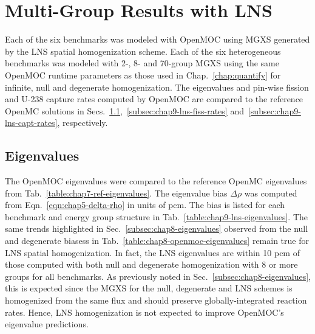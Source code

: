 \section{Multi-Group Results with LNS}
\label{sec:chap9-lns-results}

Each of the six benchmarks was modeled with OpenMOC using \ac{MGXS} generated by the \ac{LNS} spatial homogenization scheme. Each of the six heterogeneous benchmarks was modeled with 2-, 8- and 70-group \ac{MGXS} using the same OpenMOC runtime parameters as those used in Chap.~\ref{chap:quantify} for infinite, null and degenerate homogenization. The eigenvalues and pin-wise fission and U-238 capture rates computed by OpenMOC are compared to the reference OpenMC solutions in Secs.~\ref{subsec:chap9-lns-eigenvalues},~\ref{subsec:chap9-lns-fiss-rates} and~\ref{subsec:chap9-lns-capt-rates}, respectively.

\subsection{Eigenvalues}
\label{subsec:chap9-lns-eigenvalues}

The OpenMOC eigenvalues were compared to the reference OpenMC eigenvalues from Tab.~\ref{table:chap7-ref-eigenvalues}. The eigenvalue bias $\Delta\rho$ was computed from Eqn.~\ref{eqn:chap5-delta-rho} in units of \ac{pcm}. The bias is listed for each benchmark and energy group structure in Tab.~\ref{table:chap9-lns-eigenvalues}. The same trends highlighted in Sec.~\ref{subsec:chap8-eigenvalues} observed from the null and degenerate biasess in Tab.~\ref{table:chap8-openmoc-eigenvalues} remain true for \ac{LNS} spatial homogenization. In fact, the \ac{LNS} eigenvalues are within 10 \ac{pcm} of those computed with both null and degenerate homogenization with 8 or more groups for all benchmarks. As previously noted in Sec.~\ref{subsec:chap8-eigenvalues}, this is expected since the \ac{MGXS} for the null, degenerate and \ac{LNS} schemes is homogenized from the same flux and should preserve globally-integrated reaction rates. Hence, \ac{LNS} homogenization is not expected to improve OpenMOC's eigenvalue predictions.

